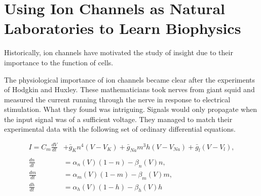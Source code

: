 



\section{Using Ion Channels as Natural Laboratories to Learn Biophysics}

Historically, ion channels have motivated the study of insight due to their importance to the function of cells.

The physiological importance of ion channels became clear after the experiments of Hodgkin and Huxley. These mathematicians took nerves from giant squid and measured the current running through the nerve in response to electrical stimulation. What they found was intriguing. Signals would only propagate when the input signal was of a sufficient voltage. They managed to match their experimental data with the following set of ordinary differential equations.

\begin{equation}
\begin{aligned}
	I = C_m \frac{dV}{dt} &+ \bar{g}_K n^4 (V - V_K) + \bar{g}_{Na} m^3 h (V - V_{Na} ) + \bar{g}_l (V-V_l) ,  \\ \\
	\frac{dn}{dt} &= \alpha_n(V)  (1-n) - \beta_n(V)  n, \\
	\frac{dm}{dt} &= \alpha_m(V)  (1-m) - \beta_m(V)  m, \\ 
	\frac{dh}{dt} &= \alpha_h(V)  (1-h) - \beta_h(V)  h  
\end{aligned}
\end{equation}

